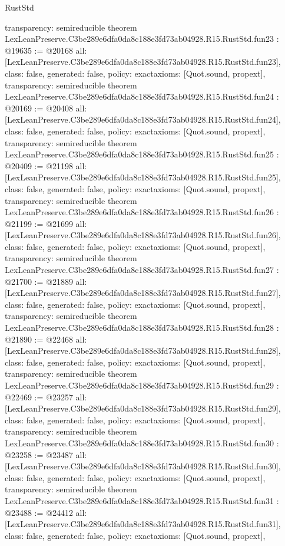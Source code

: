 \begin{lexlean}{RustStd}
\begin{coremodule}
{  transparency: semireducible
}
theorem LexLeanPreserve.C3be289e6dfa0da8c188e3fd73ab04928.R15.RustStd.fun23 : @19635 := @20168 {
  all: [LexLeanPreserve.C3be289e6dfa0da8c188e3fd73ab04928.R15.RustStd.fun23],
  class: false,
  generated: false,
  policy: exact{axioms: [Quot.sound, propext]},
  transparency: semireducible
}
theorem LexLeanPreserve.C3be289e6dfa0da8c188e3fd73ab04928.R15.RustStd.fun24 : @20169 := @20408 {
  all: [LexLeanPreserve.C3be289e6dfa0da8c188e3fd73ab04928.R15.RustStd.fun24],
  class: false,
  generated: false,
  policy: exact{axioms: [Quot.sound, propext]},
  transparency: semireducible
}
theorem LexLeanPreserve.C3be289e6dfa0da8c188e3fd73ab04928.R15.RustStd.fun25 : @20409 := @21198 {
  all: [LexLeanPreserve.C3be289e6dfa0da8c188e3fd73ab04928.R15.RustStd.fun25],
  class: false,
  generated: false,
  policy: exact{axioms: [Quot.sound, propext]},
  transparency: semireducible
}
theorem LexLeanPreserve.C3be289e6dfa0da8c188e3fd73ab04928.R15.RustStd.fun26 : @21199 := @21699 {
  all: [LexLeanPreserve.C3be289e6dfa0da8c188e3fd73ab04928.R15.RustStd.fun26],
  class: false,
  generated: false,
  policy: exact{axioms: [Quot.sound, propext]},
  transparency: semireducible
}
theorem LexLeanPreserve.C3be289e6dfa0da8c188e3fd73ab04928.R15.RustStd.fun27 : @21700 := @21889 {
  all: [LexLeanPreserve.C3be289e6dfa0da8c188e3fd73ab04928.R15.RustStd.fun27],
  class: false,
  generated: false,
  policy: exact{axioms: [Quot.sound, propext]},
  transparency: semireducible
}
theorem LexLeanPreserve.C3be289e6dfa0da8c188e3fd73ab04928.R15.RustStd.fun28 : @21890 := @22468 {
  all: [LexLeanPreserve.C3be289e6dfa0da8c188e3fd73ab04928.R15.RustStd.fun28],
  class: false,
  generated: false,
  policy: exact{axioms: [Quot.sound, propext]},
  transparency: semireducible
}
theorem LexLeanPreserve.C3be289e6dfa0da8c188e3fd73ab04928.R15.RustStd.fun29 : @22469 := @23257 {
  all: [LexLeanPreserve.C3be289e6dfa0da8c188e3fd73ab04928.R15.RustStd.fun29],
  class: false,
  generated: false,
  policy: exact{axioms: [Quot.sound, propext]},
  transparency: semireducible
}
theorem LexLeanPreserve.C3be289e6dfa0da8c188e3fd73ab04928.R15.RustStd.fun30 : @23258 := @23487 {
  all: [LexLeanPreserve.C3be289e6dfa0da8c188e3fd73ab04928.R15.RustStd.fun30],
  class: false,
  generated: false,
  policy: exact{axioms: [Quot.sound, propext]},
  transparency: semireducible
}
theorem LexLeanPreserve.C3be289e6dfa0da8c188e3fd73ab04928.R15.RustStd.fun31 : @23488 := @24412 {
  all: [LexLeanPreserve.C3be289e6dfa0da8c188e3fd73ab04928.R15.RustStd.fun31],
  class: false,
  generated: false,
  policy: exact{axioms: [Quot.sound, propext]},
}
\end{coremodule}
\end{lexlean}
